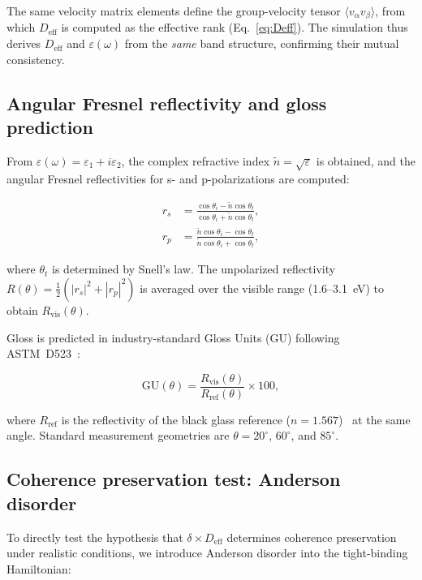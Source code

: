 \documentclass[twocolumn,showpacs,preprintnumbers,amsmath,amssymb,prb]{revtex4-2}
\begin{document}
The same velocity matrix elements define the group-velocity tensor
$\langle v_\alpha v_\beta \rangle$, from which $D_\mathrm{eff}$ is
computed as the effective rank (Eq.~\ref{eq:Deff}). The simulation
thus derives $D_\mathrm{eff}$ and $\varepsilon(\omega)$ from the
\emph{same} band structure, confirming their mutual consistency.

\subsection{Angular Fresnel reflectivity and gloss prediction}

From $\varepsilon(\omega) = \varepsilon_1 + i\varepsilon_2$, the
complex refractive index $\tilde{n} = \sqrt{\varepsilon}$ is obtained,
and the angular Fresnel reflectivities for s- and p-polarizations are
computed:

\begin{align}
  r_s &= \frac{\cos\theta_i - \tilde{n}\cos\theta_t}
              {\cos\theta_i + \tilde{n}\cos\theta_t}, \label{eq:rs} \\
  r_p &= \frac{\tilde{n}\cos\theta_i - \cos\theta_t}
              {\tilde{n}\cos\theta_i + \cos\theta_t}, \label{eq:rp}
\end{align}

\noindent where $\theta_t$ is determined by Snell's law. The
unpolarized reflectivity $R(\theta) = \frac{1}{2}(|r_s|^2 + |r_p|^2)$
is averaged over the visible range (1.6--3.1~eV) to obtain
$R_\mathrm{vis}(\theta)$.

Gloss is predicted in industry-standard Gloss Units (GU) following
ASTM~D523~\cite{ASTM_D523}:

\begin{equation}
  \mathrm{GU}(\theta) = \frac{R_\mathrm{vis}(\theta)}
    {R_\mathrm{ref}(\theta)} \times 100,
  \label{eq:GU}
\end{equation}

\noindent where $R_\mathrm{ref}$ is the reflectivity of the black
glass reference ($n = 1.567$)~\cite{ASTM_D523} at the same angle. Standard measurement
geometries are $\theta = 20^\circ$, $60^\circ$, and $85^\circ$.

\subsection{Coherence preservation test: Anderson disorder}

To directly test the hypothesis that $\delta \times D_\mathrm{eff}$
determines coherence preservation under realistic conditions, we
introduce Anderson disorder into the tight-binding Hamiltonian:
\end{document}
